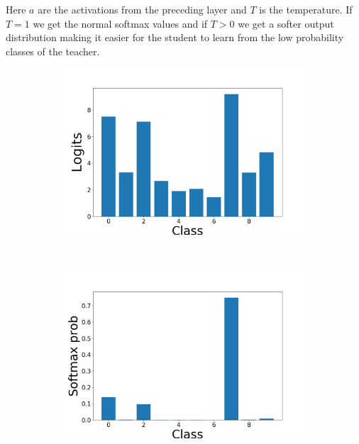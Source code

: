 \documentclass{kththesis}
\begin{document}
Here \(a\) are the activations from the preceding layer and \(T\) is the
temperature. If \(T = 1\) we get the normal softmax values and if \(T > 0\) we
get a softer output distribution making it easier for the student to learn from
the low probability classes of the teacher.

\begin{figure}[h]
    \centering
    \begin{subfigure}[b]{0.3\textwidth}
        \includegraphics[width=\textwidth]{softmax_in}
    \end{subfigure}
    ~ %
    \begin{subfigure}[b]{0.3\textwidth}
        \includegraphics[width=\textwidth]{softmax_t1}
      \end{subfigure}

\end{figure}
\end{document}
